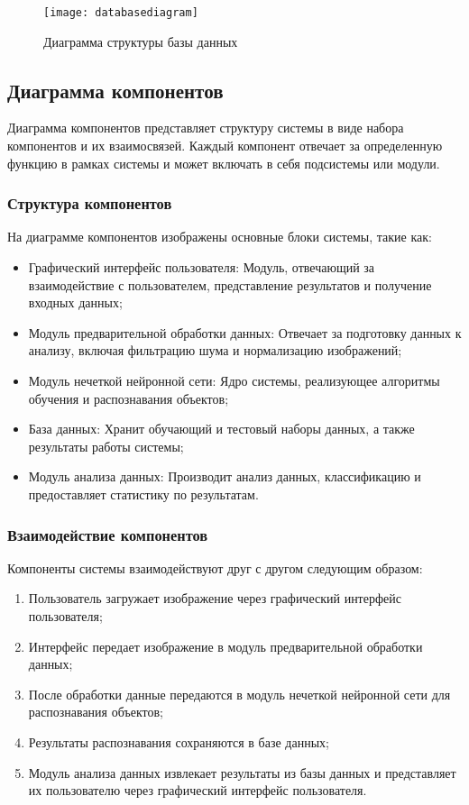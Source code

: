 \begin{figure}[ht]
\texttt{[image: databasediagram]}
\caption{Диаграмма структуры базы данных}
\label{databasediagram:image}
\end{figure}

\subsection{Диаграмма компонентов}

Диаграмма компонентов представляет структуру системы в виде набора компонентов и их взаимосвязей. Каждый компонент отвечает за определенную функцию в рамках системы и может включать в себя подсистемы или модули.

\subsubsection{Структура компонентов}
На диаграмме компонентов изображены основные блоки системы, такие как:

\begin{itemize}
\item Графический интерфейс пользователя: Модуль, отвечающий за взаимодействие с пользователем, представление результатов и получение входных данных;
\item Модуль предварительной обработки данных: Отвечает за подготовку данных к анализу, включая фильтрацию шума и нормализацию изображений;
\item Модуль нечеткой нейронной сети: Ядро системы, реализующее алгоритмы обучения и распознавания объектов;
\item База данных: Хранит обучающий и тестовый наборы данных, а также результаты работы системы;
\item Модуль анализа данных: Производит анализ данных, классификацию и предоставляет статистику по результатам.
\end{itemize}

\subsubsection{Взаимодействие компонентов}
Компоненты системы взаимодействуют друг с другом следующим образом:

\begin{enumerate}
\item Пользователь загружает изображение через графический интерфейс пользователя;
\item Интерфейс передает изображение в модуль предварительной обработки данных;
\item После обработки данные передаются в модуль нечеткой нейронной сети для распознавания объектов;
\item Результаты распознавания сохраняются в базе данных;
\item Модуль анализа данных извлекает результаты из базы данных и представляет их пользователю через графический интерфейс пользователя.
\end{enumerate}

